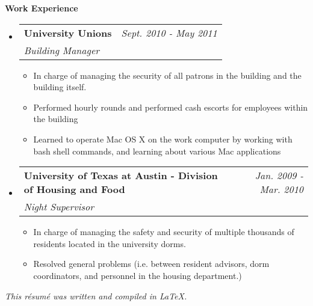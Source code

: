 \documentclass[letterpaper,10pt]{article}
\makeatletter
\newcommand{\resheading}[1]{{\large \colorbox{mygrey}{\begin{minipage}{\textwidth}{\textbf{#1 \vphantom{p\^{E}}}}\end{minipage}}}}
\newcommand{\workheading}[3]{
\begin{tabular*}{6.5in}{l@{\extracolsep{\fill}}r}
		\textbf{#1} & \textit{#3} \\
		\textit{#2}
\end{tabular*}\vspace{6pt}}
\makeatother
\begin{document}
\resheading{Work Experience}
	\begin{itemize}
	 \item
	    \workheading{University Unions}{Building Manager}{Sept. 2010 - May 2011}
	      { \begin{itemize}
	        \item{In charge of managing the security of all patrons in the building and the building itself.}
	        \item{Performed hourly rounds and performed cash escorts for employees within the building}
		\item{Learned to operate Mac OS X on the work computer by working with bash shell commands, and learning about various Mac applications}
	        \end{itemize}
	      }

	 \item
	    \workheading{University of Texas at Austin - Division of Housing and Food}{Night Supervisor}{Jan. 2009 - Mar. 2010}
	      { \begin{itemize}
	         \item{In charge of managing the safety and security of multiple thousands of residents located in the university dorms.}
		 \item{Resolved general problems (i.e. between resident advisors, dorm coordinators, and personnel in the housing department.)}
	        \end{itemize}
	      }
	\end{itemize} %




\vfill
\begin{flushright}
\em{This r\'{e}sum\'{e} was written and compiled in \LaTeX.}
\end{flushright}
\end{document}

